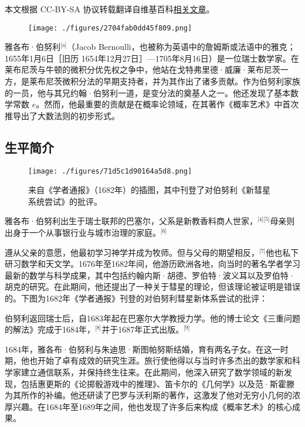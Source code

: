 
本文根据 CC-BY-SA 协议转载翻译自维基百科\href{https://en.wikipedia.org/wiki/Jacob_Bernoulli}{相关文章}。

\begin{figure}[ht]
\centering
\texttt{[image: ./figures/2704fab0dd45f809.png]}
\caption{} \label{fig_YGBbnl_1}
\end{figure}
雅各布·伯努利\(^\text{[a]}\)（Jacob Bernoulli，也被称为英语中的詹姆斯或法语中的雅克；1655年1月6日［旧历 1654年12月27日］—1705年8月16日）是一位瑞士数学家。在莱布尼茨与牛顿的微积分优先权之争中，他站在戈特弗里德·威廉·莱布尼茨一方，是莱布尼茨微积分法的早期支持者，并为其作出了诸多贡献。作为伯努利家族的一员，他与其兄约翰·伯努利一道，是变分法的奠基人之一。他还发现了基本数学常数 $e$。然而，他最重要的贡献是在概率论领域，在其著作《概率艺术》中首次推导出了大数法则的初步形式。
\subsection{生平简介}
\begin{figure}[ht]
\centering
\texttt{[image: ./figures/71d5c1d90164a5d8.png]}
\caption{来自《学者通报》（1682年）的插图，其中刊登了对伯努利《新彗星系统尝试》的批评。} \label{fig_YGBbnl_2}
\end{figure}
雅各布·伯努利出生于瑞士联邦的巴塞尔，父系是新教香料商人世家，\(^\text{[4][5]}\)母亲则出身于一个从事银行业与城市治理的家庭。\(^\text{[6]}\)

遵从父亲的意愿，他最初学习神学并成为牧师。但与父母的期望相反，\(^\text{[7]}\)他也私下研习数学和天文学。1676年至1682年间，他游历欧洲各地，向当时的著名学者学习最新的数学与科学成果，其中包括约翰内斯·胡德、罗伯特·波义耳以及罗伯特·胡克的研究。在此期间，他还提出了一种关于彗星的理论，但该理论被证明是错误的。下图为1682年《学者通报》刊登的对伯努利彗星新体系尝试的批评：

伯努利返回瑞士后，自1683年起在巴塞尔大学教授力学。他的博士论文《三重问题的解法》完成于1684年，\(^\text{[8]}\)并于1687年正式出版。\(^\text{[9]}\)

1684年，雅各布·伯努利与朱迪思·斯图帕努斯结婚，育有两名子女。在这一时期，他也开始了卓有成效的研究生涯。旅行使他得以与当时许多杰出的数学家和科学家建立通信联系，并保持终生往来。在此期间，他深入研究了数学领域的新发现，包括惠更斯的《论掷骰游戏中的推理》、笛卡尔的《几何学》以及范·斯霍滕为其所作的补编。他还研读了巴罗与沃利斯的著作，这激发了他对无穷小几何的浓厚兴趣。在1684年至1689年之间，他也发现了许多后来构成《概率艺术》的核心成果。


